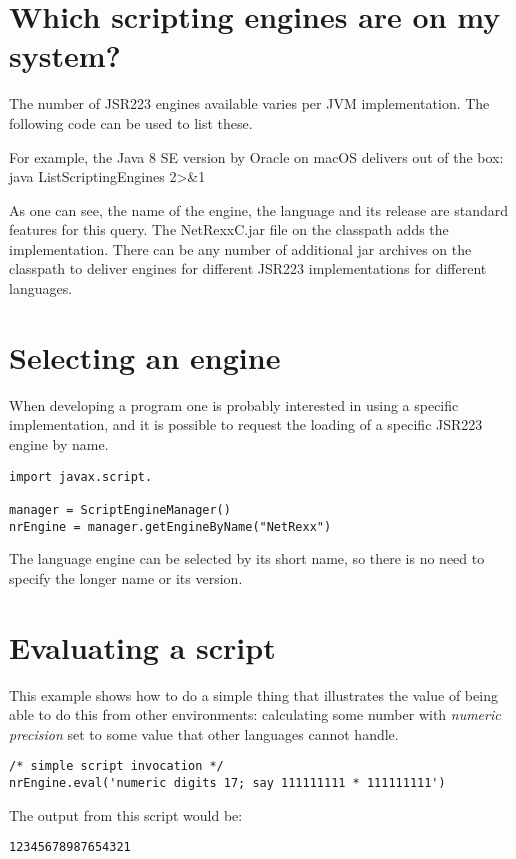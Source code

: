 \section{Which scripting engines are on my system?}
The number of JSR223 engines available varies per JVM
implementation. The following code can be used to list these.
 

For example, the Java 8 SE version by Oracle on macOS delivers out of
the box:
\bash[stdout]
java ListScriptingEngines 2>&1
\END

As one can see, the name of the engine, the language and its release are standard features for this query. The NetRexxC.jar file on the classpath adds the \nr{} implementation.
There can be any number of additional jar archives on the classpath to deliver engines for different JSR223 implementations for different languages.
\section{Selecting an engine}
When developing a program one is probably interested in using a specific implementation, and it is possible to request the loading of a specific JSR223 engine by name.
\begin{lstlisting}[label=choosingjsr223,caption=Choosing an engine]
import javax.script.

manager = ScriptEngineManager()
nrEngine = manager.getEngineByName("NetRexx")
\end{lstlisting}
The language engine can be selected by its short name, so there is no need to specify the longer name or its version.
\section{Evaluating a script}
This example shows how to do a simple thing that illustrates the value of being able to do this from other environments: calculating some number with \emph{numeric precision} set to some value that other languages cannot handle.
\begin{lstlisting}[label=evaljsr223,caption=Evaluating a script]
/* simple script invocation */
nrEngine.eval('numeric digits 17; say 111111111 * 111111111')
\end{lstlisting}
The output from this script would be:
\begin{alltt}
12345678987654321
\end{alltt}
